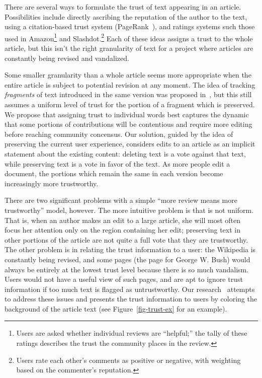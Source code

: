 
There are several ways to formulate the trust of text appearing
in an article.
Possibilities include directly ascribing the reputation
of the author to the text,
using a citation-based trust system
(\eg PageRank~\cite{PageRank98,Kleinberg99}),
and ratings systems such those used in
Amazon\footnote{Users are asked whether individual reviews
are ``helpful;'' the tally of these ratings
describes the trust the community places in the review.}
and Slashdot.\footnote{Users rate each other's comments as positive
or negative, with weighting based on the commenter's reputation.}
Each of these ideas assigns a trust to the whole article,
but this isn't the right granularity of text for a project
where articles are constantly being revised and vandalized.

Some smaller granularity than a whole article seems more
appropriate when the entire article is subject to potential
revision at any moment.
The idea of tracking \textit{fragments} of text introduced in
the same version was proposed in~\cite{McGuinness06}, but
this still assumes a uniform level of trust for the portion
of a fragment which is preserved.
We propose that assigning trust to individual words best
captures the dynamic that some portions of contributions will be
contentious and require more editing before reaching community concensus.
Our solution, guided by the idea of preserving the
current user experience, considers edits to an
article as an implicit statement about the existing content:
deleting text is a vote against that text, while preserving
text is a vote in favor of the text.
As more people edit a document, the portions which remain
the same in each version become increasingly more trustworthy.

There are two significant problems with a simple
``more review means more trustworthy'' model, however.
The more intuitive problem is that 
is not uniform.
That is, when an author makes an edit to
a large article, she will most often focus her attention only
on the region containing her edit; preserving text in
other portions of the article are not quite a full vote
that they are trustworthy.
The other problem is in relating the trust information to
a user: the Wikipedia is constantly being revised, and
some pages (\eg the page for George W. Bush) would always
be entirely at the lowest trust level because there is so much
vandalism.
Users would not have a useful view of such pages, and
are apt to ignore trust information if too much
text is flagged as untrustworthy.
Our research~\cite{WikiTrust2008} attempts to address these
issues and presents the trust information to users
by coloring the background of the article text
(see Figure~\ref{fig-trust-ex} for an example).

